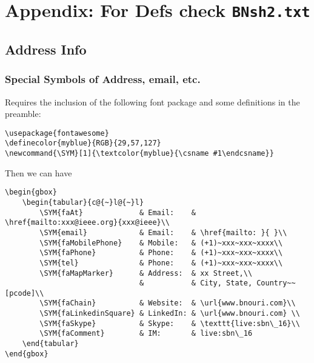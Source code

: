\np
\section{Appendix: For Defs check \texttt{BNsh2.txt}} \label{sec:bnsh3.sty}
\subsection{Address Info}
\subsubsection{Special Symbols of Address, email, etc.} 
 Requires the inclusion of the following font package and some definitions in the preamble:
\begin{SBN}
\begin{verbatim}
\usepackage{fontawesome}
\definecolor{myblue}{RGB}{29,57,127}
\newcommand{\SYM}[1]{\textcolor{myblue}{\csname #1\endcsname}}
\end{verbatim}
\end{SBN}
Then we can have

\begin{SBN}
\begin{verbatim}
\begin{gbox}
	\begin{tabular}{c@{~}l@{~}l}
		\SYM{faAt}             & Email:    & \href{mailto:xxx@ieee.org}{xxx@ieee}\\
		\SYM{email}            & Email:    & \href{mailto: }{ }\\
		\SYM{faMobilePhone}    & Mobile:   & (+1)~xxx~xxx~xxxx\\
		\SYM{faPhone}          & Phone:    & (+1)~xxx~xxx~xxxx\\
		\SYM{tel}              & Phone:    & (+1)~xxx~xxx~xxxx\\	
		\SYM{faMapMarker}      & Address:  & xx Street,\\
		                       &           & City, State, Country~~[pcode]\\
		\SYM{faChain}          & Website:  & \url{www.bnouri.com}\\
		\SYM{faLinkedinSquare} & LinkedIn: & \url{www.bnouri.com} \\
		\SYM{faSkype}          & Skype:    & \texttt{live:sbn\_16}\\
		\SYM{faComment}        & IM:       & live:sbn\_16
	\end{tabular}
\end{gbox}
\end{verbatim}
\end{SBN}

